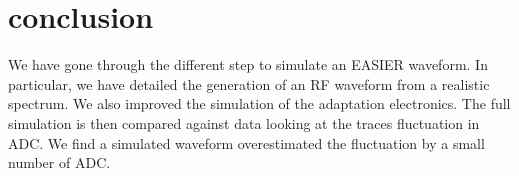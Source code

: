 \section*{conclusion}
We  have  gone  through  the  different step  to  simulate  an  EASIER
waveform.  In  particular, we  have detailed the  generation of  an RF
waveform from a realistic spectrum. We also improved the simulation of
the  adaptation  electronics. The  full  simulation  is then  compared
against  data looking at  the traces  fluctuation in  ADC.  We  find a
simulated waveform overestimated the  fluctuation by a small number of
ADC.
